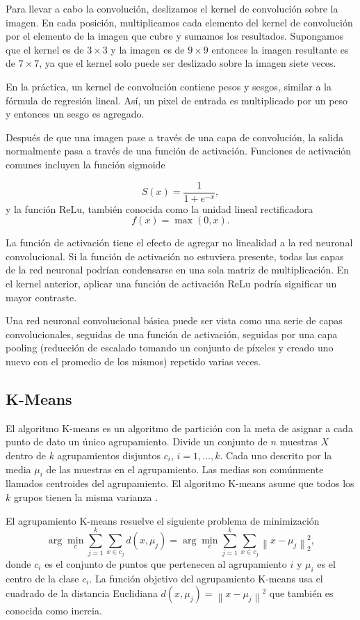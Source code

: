 Para llevar a cabo la convolución, deslizamos el kernel de convolución sobre la imagen. En cada posición, multiplicamos cada elemento del kernel de convolución por el elemento de la imagen que cubre y sumamos los resultados. Supongamos que el kernel es de $3\times3$ y la imagen es de $9\times 9$ entonces la imagen resultante es de $7\times 7$, ya que el kernel solo puede ser deslizado sobre la imagen siete veces.

En la práctica, un kernel de convolución contiene pesos y sesgos, similar a la fórmula de regresión lineal. Así, un pixel de entrada es multiplicado por un peso y entonces un sesgo es agregado.

Después de que una imagen pase a través de una capa de convolución, la salida normalmente pasa a través de una función de activación. Funciones de activación comunes incluyen la función sigmoide

\[
S(x)=\frac{1}{1+e^{-x}},
\]
y la función ReLu, también conocida como la unidad lineal rectificadora
\[
f(x)=\max (0, x).
\]
 
La función de activación tiene el efecto de agregar no linealidad a la red neuronal convolucional. Si la función de activación no estuviera presente, todas las capas de la red neuronal podrían condensarse en una sola matriz de multiplicación. En el kernel anterior, aplicar una función de activación ReLu podría significar un mayor contraste.

Una red neuronal convolucional básica puede ser vista como una serie de capas convolucionales, seguidas de una función de activación, seguidas por una capa pooling (reducción de escalado tomando un conjunto de píxeles y creado uno nuevo con el promedio de los mismos) repetido varias veces.
 

\subsection{K-Means}

El algoritmo K-means es un algoritmo de partición con la meta de asignar a cada punto de dato un único agrupamiento. Divide un conjunto de $n$ muestras $X$ dentro de $k$ agrupamientos disjuntos $c_i$, $i=1,...,k$. Cada uno descrito por la media $\mu_i$ de las muestras en el agrupamiento. Las medias son comúnmente llamados centroides del agrupamiento. El algoritmo K-means asume que todos los $k$ grupos tienen la misma varianza \parencite{igualIntroductionDataScience2017}.

El agrupamiento K-means resuelve el siguiente problema de minimización 
\begin{equation}
	\arg \min _{c} \sum_{j=1}^{k} \sum_{x \in c_{j}} d\left(x, \mu_{j}\right)=\arg \min _{c} \sum_{j=1}^{k} \sum_{x \in c_{j}}\left\|x-\mu_{j}\right\|_{2}^{2},
\end{equation}
donde $c_i$ es el conjunto de puntos que pertenecen al agrupamiento $i$ y $\mu_i$ es el centro de la clase $c_i$. La función objetivo del agrupamiento K-means usa el cuadrado de la distancia Euclidiana $d\left(x, \mu_{j}\right)=\left\|x-\mu_{j}\right\|^{2}$ que también es conocida como inercia.


